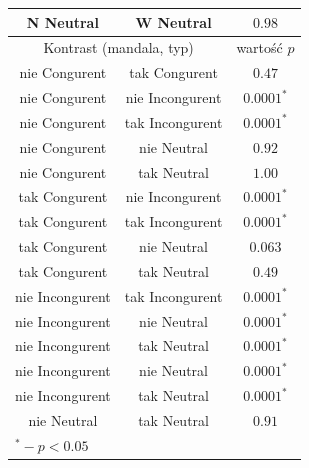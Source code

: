 \documentclass[12pt,a4paper,final,oneside,onecolumn,titlepage]{article}
\begin{document}
\begin{table}[h]
{\begin{tabular}{c c c}
N Neutral & W Neutral & $0.98$ \\
\hline
\multicolumn{2}{c}{Kontrast (mandala, typ)} & wartość $p$ \\
\hline
nie Congurent & tak Congurent & $0.47$ \\
nie Congurent & nie Incongurent & $0.0001^*$ \\
nie Congurent & tak Incongurent & $0.0001^*$ \\
nie Congurent & nie Neutral & $0.92$ \\
nie Congurent & tak Neutral & $1.00$ \\
tak Congurent & nie Incongurent & $0.0001^*$ \\
tak Congurent & tak Incongurent & $0.0001^*$ \\
tak Congurent & nie Neutral & $0.063$ \\
tak Congurent & tak Neutral & $0.49$ \\
nie Incongurent & tak Incongurent & $0.0001^*$ \\
nie Incongurent & nie Neutral & $0.0001^*$ \\
nie Incongurent & tak Neutral & $0.0001^*$ \\
nie Incongurent & nie Neutral & $0.0001^*$ \\
nie Incongurent & tak Neutral & $0.0001^*$ \\
nie Neutral & tak Neutral & $0.91$ \\
\hline
\multicolumn{3}{l}{\footnotesize{$^{*} - p<0.05$}}
\end{tabular}}
\label{Tabela}
\end{table}
\end{document}
